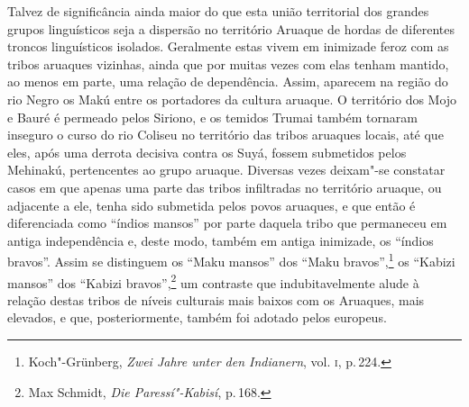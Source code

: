 Talvez de significância ainda maior do que esta união territorial dos
grandes grupos linguísticos seja a dispersão no território Aruaque de
hordas de diferentes troncos linguísticos isolados. Geralmente estas
vivem em inimizade feroz com as tribos aruaques vizinhas, ainda que por muitas
vezes com elas tenham mantido, ao menos em parte, uma relação de
dependência. Assim, aparecem na região do rio Negro os Makú
entre os portadores da cultura aruaque. O território dos Mojo e Bauré é
permeado pelos Siriono, e os temidos Trumai também tornaram inseguro o
curso do rio Coliseu no território das tribos aruaques locais, até que
eles, após uma derrota decisiva contra os Suyá, fossem submetidos pelos
Mehinakú, pertencentes ao grupo aruaque. Diversas vezes deixam"-se
constatar casos em que apenas uma parte das tribos infiltradas no
território aruaque, ou adjacente a ele, tenha sido submetida pelos povos aruaques, e
que então é diferenciada como ``índios mansos'' por parte daquela tribo
que permaneceu em antiga independência e, deste modo, também em antiga
inimizade, os ``índios bravos''. Assim se distinguem os ``Maku mansos''
dos ``Maku bravos'',\footnote{Koch"-Grünberg, \textit{Zwei Jahre unter den
  Indianern}, vol. \textsc{i}, p.\,224.} os ``Kabizi mansos'' dos ``Kabizi
bravos'',\footnote{Max Schmidt, \textit{Die Paressí"-Kabisí}, p.\,168.}
um contraste que indubitavelmente alude à relação destas tribos de
níveis culturais mais baixos com os Aruaques, mais elevados, e que, posteriormente, 
também foi adotado pelos europeus.


